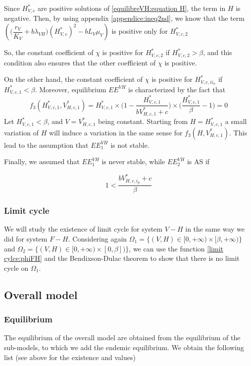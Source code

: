\documentclass{article}
\newcommand{\lv}{\lambda_{VH}}
\begin{document}
\begin{itemize}
Since $H^*_{V, c}$ are positive solutions of \eqref{equilibreVH:equation H}, the term in $H$ is negative. Then, by using appendix \ref{appendice:ineq2nd}, we know that the term $\left( \Big(\dfrac{r_V}{K_V} + b\lv\Big) (H^*_{V, c})^2 - b L_V \mu_V \right)$ is positive only for $H^*_{V, c, 2}$ 

So, the constant coefficient of $\chi$ is positive for $H^*_{V, c, 2}$ if $H^*_{V, c, 2} > \beta$, and this condition also ensures that the other coefficient of $\chi$ is positive.

On the other hand, the constant coefficient of $\chi$ is positive for $H^*_{V, c, ii_n}$ if $H^*_{V, c, 1} < \beta$.
Moreover, equilibrium $EE^{VH}$ is characterized by the fact that 
\begin{equation}
f_3(H^*_{V, c, 1},V^*_{H, c, 1}) =  H^*_{V, c, 1} \times \Big(1 - \dfrac{H^*_{V, c, 1}}{bV^*_{H, c, 1} + c} \Big) \times \Big(\dfrac{H^*_{V, c, 1}}{\beta} - 1 \Big) = 0
\end{equation}
Let $H^*_{V, c, 1} < \beta$, and $V = V^*_{H, c, 1}$ being constant. Starting from $H = H^*_{V, c, 1}$ a small variation of $H$  will induce a variation in the same sense for $f_3(H, V^*_{H, c, 1})$.
This lead to the assumption that $EE^{VH}_1$ is not stable.

Finally, we assumed that $EE^{VH}_1$ is never stable, while $EE^{VH}_2$ is AS if

\begin{equation}
1 < \dfrac{bV^*_{H,c,i_p} + c}{\beta}
\end{equation}
\end{itemize}

\subsubsection{Limit cycle}
We will study the existence of limit cycle for system $V-H$ in the same way we did for system $F-H$. Considering again $\Omega_1 = \{(V,H) \in [0, +\infty) \times [\beta, +\infty)\}$ and $\Omega_2 = \{(V,H) \in [0, +\infty) \times [0, \beta])\}$, we can use the function \eqref{limit cylce:phiFH} and the Bendixson-Dulac theorem to show that there is no limit cycle on $\Omega_1$.



\subsection{Overall model}
\subsubsection{Equilibrium}
The equilibrium of the overall model are obtained from the equilibrium of the sub-models, to which we add the endemic equilibrium. We obtain the following list (see above for the existence and values)
\end{document}

